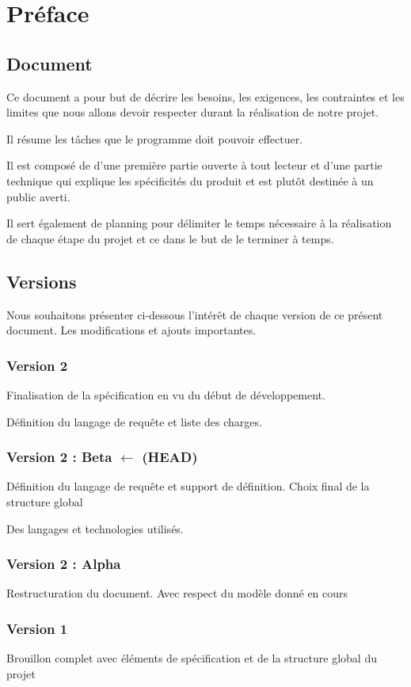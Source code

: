 \chapter*{Préface}
\section*{Document}
Ce document a pour but de décrire les besoins, les exigences, les contraintes et les limites que nous allons devoir respecter durant la réalisation de notre projet.

Il résume les tâches que le programme doit pouvoir effectuer.

Il est composé de d'une première partie ouverte à tout lecteur et d'une partie technique qui explique les spécificités du produit et est plutôt destinée à un public averti.

Il sert également de planning pour délimiter le temps nécessaire à la réalisation de chaque étape du projet et ce dans le but de le terminer à temps.

\section*{Versions}
Nous souhaitons présenter ci-dessous l'intérêt de chaque version de ce présent document. Les modifications et ajouts importantes.

\subsection*{Version 2}
Finalisation de la spécification en vu du début de développement.

Définition du langage de requête et liste des charges.

\subsection*{Version 2 : Beta $\leftarrow$ (HEAD)}
Définition du langage de requête et support de définition. Choix final de la structure global

Des langages et technologies utilisés.

\subsection*{Version 2 : Alpha}
Restructuration du document. Avec respect du modèle donné en cours

\subsection*{Version 1}
Brouillon complet avec éléments de spécification et de la structure global du projet